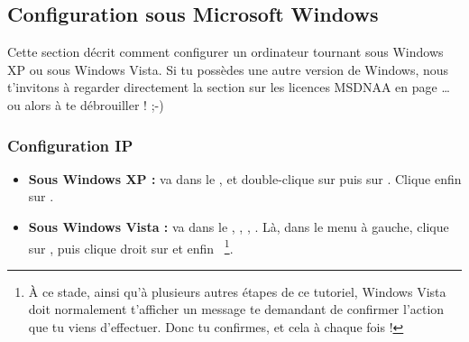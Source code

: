 


\subsection{Configuration sous Microsoft Windows}

Cette section décrit comment configurer un ordinateur tournant sous Windows XP ou sous Windows Vista. Si tu possèdes une autre version de Windows,
nous t'invitons à regarder directement la section sur les licences MSDNAA en page \pageref{msdnaa}\dots ou alors à te débrouiller ! ;-)

\subsubsection{Configuration IP}

\begin{itemize}

\item \textbf{Sous Windows XP :} va dans le ,  et double-clique sur  puis sur . Clique enfin sur .

\item \textbf{Sous Windows Vista :} va dans le , , , . Là, dans le menu à gauche, clique sur , puis clique droit sur  et enfin  ~\footnote{\`A ce stade, ainsi qu'à plusieurs autres étapes de ce tutoriel, Windows Vista doit normalement t'afficher un message te demandant de confirmer l'action que tu viens d'effectuer. Donc tu confirmes, et cela à chaque fois !}.

\end{itemize}





